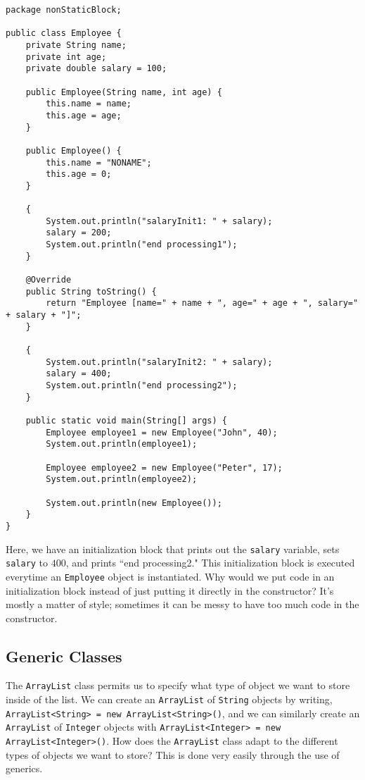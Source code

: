 \begin{lstlisting}
package nonStaticBlock;

public class Employee {
	private String name;
	private int age;
	private double salary = 100;

	public Employee(String name, int age) {
		this.name = name;
		this.age = age;
	}

	public Employee() {
		this.name = "NONAME";
		this.age = 0;
	}

	{
		System.out.println("salaryInit1: " + salary);
		salary = 200;
		System.out.println("end processing1");
	}

	@Override
	public String toString() {
		return "Employee [name=" + name + ", age=" + age + ", salary=" + salary + "]";
	}

	{
		System.out.println("salaryInit2: " + salary);
		salary = 400;
		System.out.println("end processing2");
	}

	public static void main(String[] args) {
		Employee employee1 = new Employee("John", 40);
		System.out.println(employee1);

		Employee employee2 = new Employee("Peter", 17);
		System.out.println(employee2);

		System.out.println(new Employee());
	}
}
\end{lstlisting}

Here, we have an initialization block that prints out the \verb!salary! variable, sets \verb!salary! to $400$, and prints ``end processing2." This initialization block is executed everytime an \verb!Employee! object is instantiated. Why would we put code in an initialization block instead of just putting it directly in the constructor? It's mostly a matter of style; sometimes it can be messy to have too much code in the constructor.

\subsection{Generic Classes}
The \verb!ArrayList! class permits us to specify what type of object we want to store inside of the list. We can create an \verb!ArrayList! of \verb!String! objects by writing, \verb!ArrayList<String> = new ArrayList<String>()!, and we can similarly create an \verb!ArrayList! of \verb!Integer! objects with \verb!ArrayList<Integer> = new ArrayList<Integer>()!. How does the \verb!ArrayList! class adapt to the different types of objects we want to store? This is done very easily through the use of generics.


